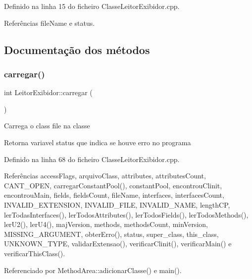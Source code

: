 Definido na linha 15 do ficheiro Classe\+Leitor\+Exibidor.\+cpp.



Referências file\+Name e status.



\subsection{Documentação dos métodos}
\mbox{\label{classLeitorExibidor_a493a9aed1941a4f01c611a2deeb37f8d}} 
\subsubsection{\texorpdfstring{carregar()}{carregar()}}
{\footnotesize\ttfamily int Leitor\+Exibidor\+::carregar (\begin{DoxyParamCaption}{ }\end{DoxyParamCaption})}

Carrega o class file na classe \begin{DoxyReturn}{Retorna}
variavel status que indica se houve erro no programa 
\end{DoxyReturn}


Definido na linha 68 do ficheiro Classe\+Leitor\+Exibidor.\+cpp.



Referências access\+Flags, arquivo\+Class, attributes, attributes\+Count, C\+A\+N\+T\+\_\+\+O\+P\+EN, carregar\+Constant\+Pool(), constant\+Pool, encontrou\+Clinit, encontrou\+Main, fields, fields\+Count, file\+Name, interfaces, interfaces\+Count, I\+N\+V\+A\+L\+I\+D\+\_\+\+E\+X\+T\+E\+N\+S\+I\+ON, I\+N\+V\+A\+L\+I\+D\+\_\+\+F\+I\+LE, I\+N\+V\+A\+L\+I\+D\+\_\+\+N\+A\+ME, length\+CP, ler\+Todas\+Interfaces(), ler\+Todos\+Attributes(), ler\+Todos\+Fields(), ler\+Todos\+Methods(), ler\+U2(), ler\+U4(), maj\+Version, methods, methods\+Count, min\+Version, M\+I\+S\+S\+I\+N\+G\+\_\+\+A\+R\+G\+U\+M\+E\+NT, obter\+Erro(), status, super\+\_\+class, this\+\_\+class, U\+N\+K\+N\+O\+W\+N\+\_\+\+T\+Y\+PE, validar\+Extensao(), verificar\+Clinit(), verificar\+Main() e verificar\+This\+Class().



Referenciado por Method\+Area\+::adicionar\+Classe() e main().


